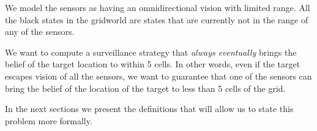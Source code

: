 We model the sensors as having an omnidirectional vision with limited range. All the black states in the gridworld are states that are currently not in the range of any of the sensors. 

 We want to compute a surveillance strategy that \emph{always eventually} brings the belief of the target location to within 5 cells. In other words, even if the target escapes vision of all the sensors, we want to guarantee that one of the sensors can bring the belief of the location of the target to less than 5 cells of the grid. 

In the next sections we present the definitions that will allow us to state this problem more formally.